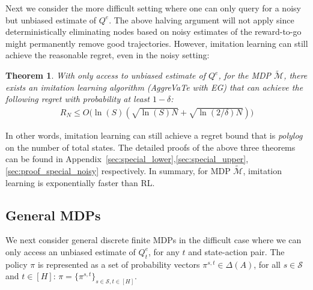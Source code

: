 \documentclass{article}
\newtheorem{theorem}{Theorem}[section]
\begin{document}
Next we consider the more difficult setting where one can only query for a noisy but unbiased estimate of $Q^e$. The above halving argument will not apply since deterministically eliminating nodes based on noisy estimates of the reward-to-go might permanently remove good trajectories. However, imitation learning can still achieve the reasonable regret, even in the noisy setting:
\begin{theorem}
\label{them:special_lower_noisy}
With only access to unbiased estimate of $Q^e$, for the MDP $\tilde{\mathcal{M}}$, there exists an imitation learning algorithm (AggreVaTe with EG) that can achieve the following regret with probability at least $1-\delta$:
\begin{align}
R_N \leq O\Big(\ln(S)(\sqrt{\ln(S)N}+\sqrt{\ln(2/\delta)N})\Big)
\end{align}
\end{theorem} In other words, imitation learning can still achieve a regret bound that is \emph{polylog} on the number of total states. The detailed proofs of the above three theorems can be found in Appendix~\ref{sec:special_lower},\ref{sec:special_upper},\ref{sec:proof_special_noisy} respectively. %
In summary, for MDP $\tilde{\mathcal{M}}$, imitation learning is exponentially faster than RL. 

\subsection{General MDPs}
We next consider general discrete finite MDPs in the difficult case where we can only access an unbiased estimate of $Q^e_t$, for any $t$ and state-action pair. The policy $\pi$ is represented as a set of probability vectors $\pi^{s,t}\in\Delta(A)$, for all $s \in\mathcal{S}$ and  $t\in[H]$: $\pi = \{\pi^{s,t}\}_{s\in\mathcal{S},t\in[H]}$. 

\end{document}
